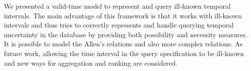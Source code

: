 We presented a valid-time model to represent and query ill-known temporal intervals. The main advantage of this framework is that it works with ill-known intervals and thus tries to correctly represents and handle querying temporal uncertainty in the database by providing both possibility and necessity measures. 
It is possible to model the Allen's relations and also more complex relations. As future work, allowing the time interval in the query specification to be ill-known and new ways for aggregation and ranking are considered. 